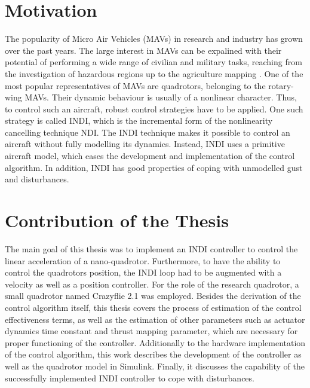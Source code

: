 \documentclass[11pt, a4paper, twoside]{report}
\begin{document}
\thispagestyle{fancy}

\section{Motivation} \label{sec:motivation}

The popularity of Micro Air Vehicles (MAVs) in research and industry has grown over the past years. The large interest in \acrshort{MAV}s can be expalined with their potential of performing a wide range of civilian and military tasks, reaching from the investigation of hazardous regions up to the agriculture mapping \cite{Ward}. One of the most popular representatives of \acrshort{MAV}s are quadrotors, belonging to the rotary-wing \acrshort{MAV}s. Their dynamic behaviour is usually of a nonlinear character. Thus, to control such an aircraft, robust control strategies have to be applied. One such strategy is called \acrfull{INDI}, which is the incremental form of the nonlinearity cancelling technique \acrfull{NDI}. The \acrshort{INDI} technique makes it possible to control an aircraft without fully modelling its dynamics. Instead, \acrshort{INDI} uses a primitive aircraft model, which eases the development and implementation of the control algorithm. In addition, \acrshort{INDI} has good properties of coping with unmodelled gust and disturbances. 

\section{Contribution of the Thesis} \label{sec:contribution_ofthe_thesis}

The main goal of this thesis was to implement an \acrshort{INDI} controller to control the linear acceleration of a nano-quadrotor. Furthermore, to have the ability to control the quadrotors position, the \acrshort{INDI} loop had to be augmented with a velocity as well as a position controller. For the role of the research quadrotor, a small quadrotor named Crazyflie 2.1 was employed. Besides the derivation of the control algorithm itself, this thesis covers the process of estimation of the control effectiveness terms, as well as the estimation of other parameters such as actuator dynamics time constant and thrust mapping parameter, which are necessary for proper functioning of the controller. Additionally to the hardware implementation of the control algorithm, this work describes the development of the controller as well as the quadrotor model in Simulink. Finally, it discusses the capability of the successfully implemented \acrshort{INDI} controller to cope with disturbances. 
\end{document}
